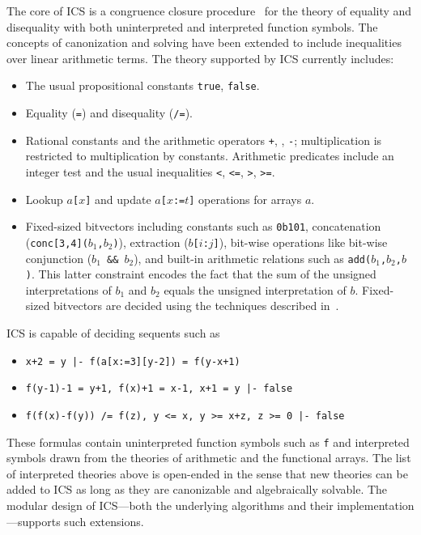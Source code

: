 \documentclass[12pt]{article}
\begin{document}
The core of ICS is a congruence closure procedure~\cite{RuessShankar2001,ShankarRuess2002}
for the theory of equality and disequality with both uninterpreted and
interpreted function symbols.  The concepts of canonization and solving
have been extended to include inequalities over linear arithmetic
terms. The theory supported by ICS currently includes:
  \begin{itemize}
  \item The usual propositional constants {\tt true}, {\tt false}.
  \item Equality ({\tt =}) and disequality ({\tt /=})\@.
  \item Rational constants and the arithmetic
        operators {\tt +}, {\tt *}, {\tt -}\@;
        multiplication is restricted to
        multiplication by constants.
        Arithmetic predicates include an integer test and
        the usual inequalities {\tt <}, {\tt <=}, {\tt >}, {\tt >=}\@.
  \item Lookup {\tt $a$[$x$]} and update {\tt $a$[$x$:=$t$]}
        operations for arrays $a$\@.
  \item Fixed-sized bitvectors including constants such as {\tt 0b101},
        concatenation ({\tt conc[3,4]($b_1$,$b_2$)}),
        extraction ({\tt $b$[$i$:$j$]}), bit-wise operations
        like bit-wise conjunction  ({\tt $b_1$ \&\& $b_2$}),
        and built-in arithmetic relations such as {\tt add($b_1$,$b_2$,$b$)}\@.
        This latter constraint encodes the fact that the sum of the unsigned
        interpretations of $b_1$ and $b_2$ equals the unsigned
        interpretation of $b$.  Fixed-sized bitvectors are
        decided using the techniques described in~\cite{Moeller98:FMCAD}\@.
  \end{itemize}
ICS is capable of deciding sequents such as
  \begin{itemize}
  \item {\tt x+2 = y |- f(a[x:=3][y-2]) = f(y-x+1)}
  \item {\tt f(y-1)-1 = y+1, f(x)+1 = x-1, x+1 = y |- false}
  \item {\tt f(f(x)-f(y)) /= f(z),  y <= x, y >= x+z, z >= 0 |- false}
  \end{itemize}
These formulas contain uninterpreted function symbols
such as {\tt f} and interpreted symbols drawn from the theories of
arithmetic and the functional arrays.  The list of
interpreted theories above is open-ended in the sense that new
theories can be added to ICS as long as they are canonizable and
algebraically solvable. The modular design of ICS---both the
underlying algorithms and their implementation---supports such
extensions.
\end{document}
